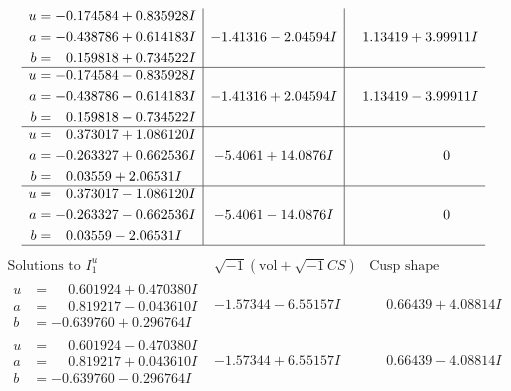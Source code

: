 \documentclass[1p]{elsarticle_modified}
\theoremstyle{definition}
\newcommand{\I}{\sqrt{-1}}
\begin{document}
$$\begin{array}{c|c|c}
\begin{aligned}
u &= -0.174584 + 0.835928 I \\
a &= -0.438786 + 0.614183 I \\
b &= \phantom{-}0.159818 + 0.734522 I\end{aligned}
 & -1.41316 - 2.04594 I & \phantom{-}1.13419 + 3.99911 I \\ \hline\begin{aligned}
u &= -0.174584 - 0.835928 I \\
a &= -0.438786 - 0.614183 I \\
b &= \phantom{-}0.159818 - 0.734522 I\end{aligned}
 & -1.41316 + 2.04594 I & \phantom{-}1.13419 - 3.99911 I \\ \hline\begin{aligned}
u &= \phantom{-}0.373017 + 1.086120 I \\
a &= -0.263327 + 0.662536 I \\
b &= \phantom{-}0.03559 + 2.06531 I\end{aligned}
 & -5.4061 + 14.0876 I & \phantom{-0.000000 } 0 \\ \hline\begin{aligned}
u &= \phantom{-}0.373017 - 1.086120 I \\
a &= -0.263327 - 0.662536 I \\
b &= \phantom{-}0.03559 - 2.06531 I\end{aligned}
 & -5.4061 - 14.0876 I & \phantom{-0.000000 } 0\\
 \hline 
 \end{array}$$\newpage$$\begin{array}{c|c|c}  
\text{Solutions to }I^u_{1}& \I (\text{vol} + \sqrt{-1}CS) & \text{Cusp shape}\\
 \hline 
\begin{aligned}
u &= \phantom{-}0.601924 + 0.470380 I \\
a &= \phantom{-}0.819217 - 0.043610 I \\
b &= -0.639760 + 0.296764 I\end{aligned}
 & -1.57344 - 6.55157 I & \phantom{-}0.66439 + 4.08814 I \\ \hline\begin{aligned}
u &= \phantom{-}0.601924 - 0.470380 I \\
a &= \phantom{-}0.819217 + 0.043610 I \\
b &= -0.639760 - 0.296764 I\end{aligned}
 & -1.57344 + 6.55157 I & \phantom{-}0.66439 - 4.08814 I \\ \hline\begin{aligned}

\end{aligned}
\end{array}$$
\end{document}
